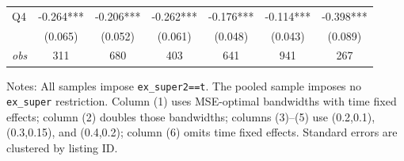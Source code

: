 \begin{table}[!htbp]
\begin{tabular}{lcccccc}
Q4 & -0.264*** & -0.206*** & -0.262*** & -0.176*** & -0.114*** & -0.398*** \\
 & (0.065) & (0.052) & (0.061) & (0.048) & (0.043) & (0.089) \\
\textit{obs} & 311 & 680 & 403 & 641 & 941 & 267 \\
\bottomrule
\end{tabular}
\begin{minipage}{0.98\textwidth}\footnotesize
Notes: All samples impose \texttt{ex\_super2==t}. The pooled sample imposes no \texttt{ex\_super} restriction. Column (1) uses MSE-optimal bandwidths with time fixed effects; column (2) doubles those bandwidths; columns (3)--(5) use (0.2,0.1), (0.3,0.15), and (0.4,0.2); column (6) omits time fixed effects. Standard errors are clustered by listing ID.
\end{minipage}
\end{table}


